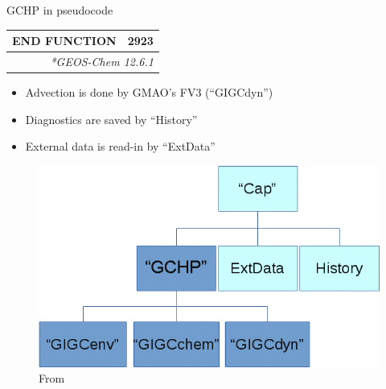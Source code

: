 \documentclass[10pt]{beamer}
\begin{document}
\begin{frame}[fragile]{GCHP in pseudocode}
\begin{table}[]
\begin{tabular}{ll}
    \textbf{END FUNCTION} & 2923 \\ \hline
    \multicolumn{2}{r}{\fontsize{4}{4}\selectfont\textit{*GEOS-Chem 12.6.1}} \\
    \end{tabular}
    \end{table}
    \footnotesize
    \begin{minipage}[c]{0.6\textwidth}
        \begin{itemize}
            \item Advection is done by GMAO's FV3 (``GIGCdyn'')
            \vspace{0.2cm}
            \item Diagnostics are saved by ``History''
            \vspace{0.2cm}
            \item External data is read-in by ``ExtData''
        \end{itemize}
    \end{minipage}
    \begin{minipage}[c]{0.39\textwidth}
        \begin{figure}
            \centering
            \includegraphics[width=\textwidth]{gchp_components.png}
            \captionsetup{labelformat=empty}
            \caption{From \cite{geos-chem_developers_developing_2019}}
        \end{figure}
    \end{minipage}
    
\end{frame}
\end{document}
